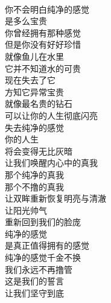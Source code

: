 \begin{poem}[千金不换]
    \begin{multicols}{3}
        \centering~\\
        你不会明白纯净的感觉 \\ 是多么宝贵 \\ 你曾经拥有那种感觉 \\ 但是你没有好好珍惜 \\ 就像鱼儿在水里 \\ 它并不知道水的可贵 \\ 现在失去了它 \\ 方知它异常宝贵 \\ 就像最名贵的钻石 \\ 可以让你的人生彻底闪亮 \\ 失去纯净的感觉 \\ 你的人生 \\ 将会变得无比灰暗 \\ 让我们唤醒内心中的真我 \\ 那个纯净的真我 \\ 那个不撸的真我 \\ 让双眸重新恢复明亮与清澈 \\ 让阳光帅气 \\ 重新回到我们的脸庞 \\ 纯净的感觉 \\ 是真正值得拥有的感觉 \\ 纯净的感觉千金不换 \\ 我们永远不再撸管 \\ 这是我们的誓言 \\ 让我们坚守到底
    \end{multicols}
\end{poem}
